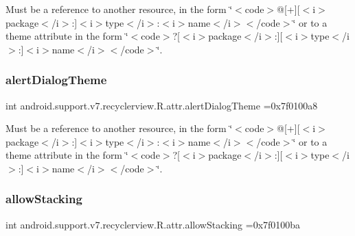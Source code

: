 Must be a reference to another resource, in the form \char`\"{}$<$code$>$@\mbox{[}+\mbox{]}\mbox{[}$<$i$>$package$<$/i$>$\+:\mbox{]}$<$i$>$type$<$/i$>$\+:$<$i$>$name$<$/i$>$$<$/code$>$\char`\"{} or to a theme attribute in the form \char`\"{}$<$code$>$?\mbox{[}$<$i$>$package$<$/i$>$\+:\mbox{]}\mbox{[}$<$i$>$type$<$/i$>$\+:\mbox{]}$<$i$>$name$<$/i$>$$<$/code$>$\char`\"{}. \mbox{\label{classandroid_1_1support_1_1v7_1_1recyclerview_1_1R_1_1attr_a9af231d17ff8bc4f55d23c219ba61960}} 
\subsubsection{\texorpdfstring{alert\+Dialog\+Theme}{alertDialogTheme}}
{\footnotesize\ttfamily int android.\+support.\+v7.\+recyclerview.\+R.\+attr.\+alert\+Dialog\+Theme =0x7f0100a8\hspace{0.3cm}{\ttfamily [static]}}

Must be a reference to another resource, in the form \char`\"{}$<$code$>$@\mbox{[}+\mbox{]}\mbox{[}$<$i$>$package$<$/i$>$\+:\mbox{]}$<$i$>$type$<$/i$>$\+:$<$i$>$name$<$/i$>$$<$/code$>$\char`\"{} or to a theme attribute in the form \char`\"{}$<$code$>$?\mbox{[}$<$i$>$package$<$/i$>$\+:\mbox{]}\mbox{[}$<$i$>$type$<$/i$>$\+:\mbox{]}$<$i$>$name$<$/i$>$$<$/code$>$\char`\"{}. \mbox{\label{classandroid_1_1support_1_1v7_1_1recyclerview_1_1R_1_1attr_a1b62208aae2d6183a590f959fa72d3d8}} 
\subsubsection{\texorpdfstring{allow\+Stacking}{allowStacking}}
{\footnotesize\ttfamily int android.\+support.\+v7.\+recyclerview.\+R.\+attr.\+allow\+Stacking =0x7f0100ba\hspace{0.3cm}{\ttfamily [static]}}

